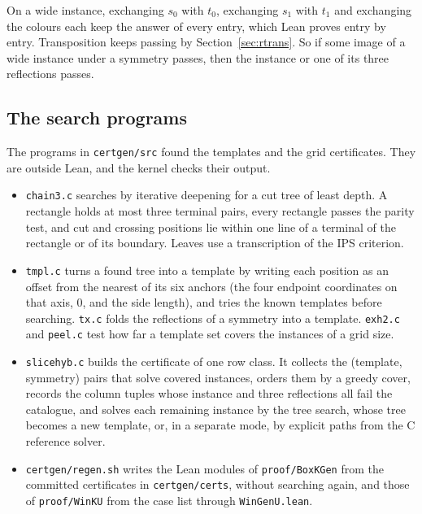 \documentclass[11pt]{article}
\newcommand{\lean}[1]{\texttt{#1}}
\begin{document}
On a wide instance, exchanging $s_0$ with $t_0$, exchanging $s_1$ with $t_1$ and exchanging the
colours each keep the answer of every entry, which Lean proves entry by entry. Transposition
keeps passing by Section~\ref{sec:rtrans}. So if some image of a wide instance under a symmetry passes, then the
instance or one of its three reflections passes.

\subsection{The search programs}

The programs in \lean{certgen/src} found the templates and the grid certificates. They are outside
Lean, and the kernel checks their output.
\begin{itemize}
\item \lean{chain3.c} searches by iterative deepening for a cut tree of least depth. A rectangle
  holds at most three terminal pairs, every rectangle passes the parity test, and cut and crossing
  positions lie within one line of a terminal of the rectangle or of its boundary. Leaves use a
  transcription of the IPS criterion.
\item \lean{tmpl.c} turns a found tree into a template by writing each position as an offset from
  the nearest of its six anchors (the four endpoint coordinates on that axis, $0$, and the side
  length), and tries the known templates before searching. \lean{tx.c} folds the reflections of a
  symmetry into a template. \lean{exh2.c} and \lean{peel.c} test how far a template set covers the
  instances of a grid size.
\item \lean{slicehyb.c} builds the certificate of one row class. It collects the
  (template, symmetry) pairs that solve covered instances, orders them by a greedy cover, records
  the column tuples whose instance and three reflections all fail the catalogue, and solves each
  remaining instance by the tree search, whose tree becomes a new template, or, in a separate
  mode, by explicit paths from the C reference solver.
\item \lean{certgen/regen.sh} writes the Lean modules of \lean{proof/BoxKGen} from the committed
  certificates in \lean{certgen/certs}, without searching again, and those of \lean{proof/WinKU}
  from the case list through \lean{WinGenU.lean}.
\end{itemize}
\end{document}
